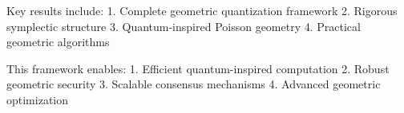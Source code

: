 \documentclass[12pt]{article}
\begin{document}
Key results include:
1. Complete geometric quantization framework
2. Rigorous symplectic structure
3. Quantum-inspired Poisson geometry
4. Practical geometric algorithms

This framework enables:
1. Efficient quantum-inspired computation
2. Robust geometric security
3. Scalable consensus mechanisms
4. Advanced geometric optimization



\end{document}
